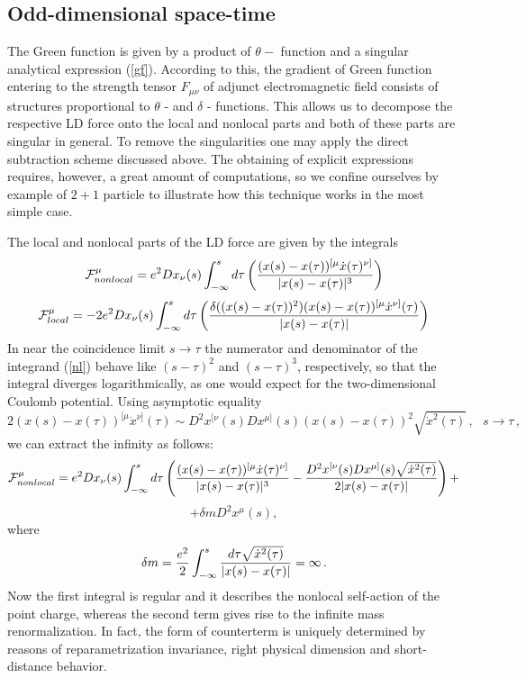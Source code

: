 \documentclass[a4paper,12pt]{article}
\begin{document}
\subsection{ Odd-dimensional space-time}

The Green function is given by a product of $\theta -$ function and a
singular analytical expression (\ref{gf}). According to this, the gradient
of Green function entering to the strength tensor $F_{\mu \nu }$ of adjunct
electromagnetic field consists of structures proportional to $\theta $ - and
$\delta $ - functions. This allows us to decompose the respective LD force
onto the local and nonlocal parts and both of these parts are singular in
general. To remove the singularities one may apply the direct subtraction
scheme discussed above. The obtaining of explicit expressions requires,
however, a great amount of computations, so we confine ourselves by example
of $2+1$ particle to illustrate how this technique works in the most simple
case.

The local and nonlocal parts of the LD force are given by the integrals
\begin{equation}  \label{nl}
{\cal F}_{nonlocal}^\mu = e^2Dx_{\nu}(s) \int_{-\infty}^s d\tau \left(\frac
{(x(s)-x(\tau ))^{[\mu}\dot{x}(\tau )^{\nu]}}{|x(s)-x(\tau )|^3}\right)
\end{equation}
\begin{equation}  \label{l}
{\cal F}_{local}^\mu=-2e^2Dx_\nu (s)\int_{-\infty}^s d\tau \left(\frac{%
\delta ((x(s)-x(\tau ))^2)(x(s)-x(\tau ))^{[\mu}\dot{x}^{\nu ]}(\tau) }{%
|x(s)-x(\tau )|}\right)
\end{equation}
In near the coincidence limit $s\rightarrow \tau $ the numerator and
denominator of the integrand (\ref{nl}) behave like $(s-\tau)^2$ and $(s-\tau
)^3$, respectively, so that the integral diverges logarithmically, as one
would expect for the two-dimensional Coulomb potential. Using asymptotic
equality
\begin{equation}  \label{aeq}
2(x(s)-x(\tau ))^{[\mu}\dot{x}^{\nu ]}(\tau ) \sim D^2x^{[\nu}(s)Dx^{\mu
]}(s) (x(s)-x(\tau))^2\sqrt{\dot{x}^2(\tau )}\,,\,\,\,\, s\rightarrow \tau\,,
\end{equation}
we can extract the infinity as follows:
\begin{equation}  \label{extr}
{\cal F}^\mu_{nonlocal}=e^2Dx_{\nu}(s) \int_{-\infty}^s d\tau \left(\frac
{(x(s)-x(\tau ))^{[\mu}\dot{x}(\tau)^{\nu]}}{|x(s)-x(\tau)|^3}- \frac{%
D^2x^{[\nu}(s)Dx^{\mu ]}(s)\sqrt{\dot{x}^2(\tau )}} {2|x(s)-x(\tau)|}
\right) +
\end{equation}
\begin{equation*}
+ \delta m D^2x^\mu(s),
\end{equation*}
where
\begin{equation}
\delta m=\frac {e^2}2\int_{-\infty}^s \frac{d\tau \sqrt{\dot{x}^2(\tau )}}{%
|x(s)-x(\tau )|}=\infty\,.
\end{equation}
Now the first integral is regular and it describes the nonlocal self-action
of the point charge, whereas the second term gives rise to the infinite mass
renormalization. In fact, the form of counterterm is uniquely determined by
reasons of reparametrization invariance, right physical dimension and
short-distance behavior.
\end{document}
